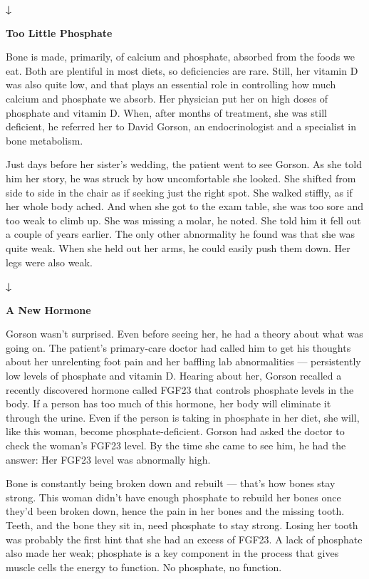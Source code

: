 \textbf{↓}

\textbf{Too Little Phosphate}

Bone is made, primarily, of calcium and phosphate, absorbed from the
foods we eat. Both are plentiful in most diets, so deficiencies are
rare. Still, her vitamin D was also quite low, and that plays an
essential role in controlling how much calcium and phosphate we absorb.
Her physician put her on high doses of phosphate and vitamin D. When,
after months of treatment, she was still deficient, he referred her to
David Gorson, an endocrinologist and a specialist in bone metabolism.

Just days before her sister's wedding, the patient went to see Gorson.
As she told him her story, he was struck by how uncomfortable she
looked. She shifted from side to side in the chair as if seeking just
the right spot. She walked stiffly, as if her whole body ached. And when
she got to the exam table, she was too sore and too weak to climb up.
She was missing a molar, he noted. She told him it fell out a couple of
years earlier. The only other abnormality he found was that she was
quite weak. When she held out her arms, he could easily push them down.
Her legs were also weak.

\textbf{↓}

\textbf{A New Hormone}

Gorson wasn't surprised. Even before seeing her, he had a theory about
what was going on. The patient's primary-care doctor had called him to
get his thoughts about her unrelenting foot pain and her baffling lab
abnormalities --- persistently low levels of phosphate and vitamin D.
Hearing about her, Gorson recalled a recently discovered hormone called
FGF23 that controls phosphate levels in the body. If a person has too
much of this hormone, her body will eliminate it through the urine. Even
if the person is taking in phosphate in her diet, she will, like this
woman, become phosphate-deficient. Gorson had asked the doctor to check
the woman's FGF23 level. By the time she came to see him, he had the
answer: Her FGF23 level was abnormally high.

Bone is constantly being broken down and rebuilt --- that's how bones
stay strong. This woman didn't have enough phosphate to rebuild her
bones once they'd been broken down, hence the pain in her bones and the
missing tooth. Teeth, and the bone they sit in, need phosphate to stay
strong. Losing her tooth was probably the first hint that she had an
excess of FGF23. A lack of phosphate also made her weak; phosphate is a
key component in the process that gives muscle cells the energy to
function. No phosphate, no function.


